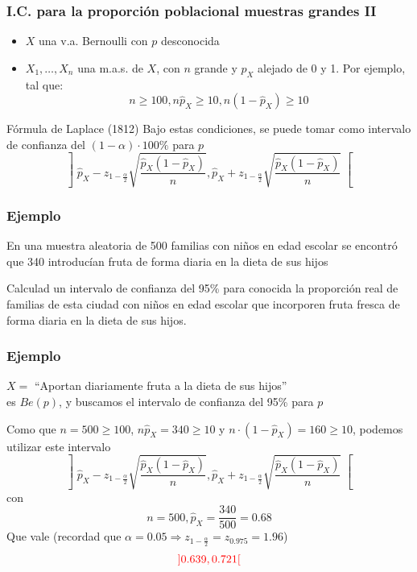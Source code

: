\documentclass[12pt,t]{beamer}\usepackage[]{graphicx}\usepackage[]{color}
\newcommand{\red}[1]{\textcolor{red}{#1}}
\renewcommand{\geq}{\geqslant}
\theoremstyle{plain}
\theoremstyle{definition}
\begin{document}
\begin{frame}[fragile]
\frametitle{I.C. para la proporción poblacional muestras grandes II}

\begin{itemize}
\item  $X$ una v.a. Bernoulli con $p$ desconocida
\item $X_1,\ldots,X_n$ una m.a.s. de $X$, con $n$  grande y $\widehat{p}_{X}$ alejado  de 0 y 1. Por ejemplo, tal que:
$$
n\geq 100, n\widehat{p}_{X}\geq 10,  n(1-\widehat{p}_{X})\geq 10
$$
\end{itemize}
\medskip

\begin{block}{Fórmula de Laplace (1812)}
Bajo  estas  condiciones, se puede tomar como intervalo de  confianza  del $(1-\alpha)\cdot 100\%$ para $p$
$$
\left]\widehat{p}_{X}-z_{1-\frac{\alpha}{2}}\sqrt{\frac{\widehat{p}_{X}
(1-\widehat{p}_{X})}{n}},
\widehat{p}_{X}+z_{1-\frac{\alpha}{2}}\sqrt{\frac{\widehat{p}_{X}
(1-\widehat{p}_{X})}{n}}\right[$$
\end{block}
\end{frame}



\begin{frame}
\frametitle{Ejemplo}

En una muestra aleatoria de 500 familias con niños en edad escolar se encontró que 
340 introducían fruta de forma diaria en la dieta de sus hijos
\medskip

Calculad un intervalo de confianza  del 95\% para  conocida la proporción real de
familias de esta ciudad con niños en edad escolar que incorporen fruta fresca de
forma diaria en la dieta de sus hijos.


\end{frame}
\begin{frame}
\frametitle{Ejemplo}

$X=$ ``Aportan diariamente fruta a la dieta de sus hijos''\\
 es $Be(p)$, y buscamos el  intervalo de confianza  del 95\%  para $p$ 
\bigskip

Como que $n=500\geq 100$, $n\widehat{p}_X=340\geq 10$ y $n\cdot (1-\widehat{p}_X)=160\geq 10$, podemos utilizar  este intervalo
$$
\left]\widehat{p}_{X}-z_{1-\frac{\alpha}{2}}\sqrt{\frac{\widehat{p}_{X}
(1-\widehat{p}_{X})}{n}},
\widehat{p}_{X}+z_{1-\frac{\alpha}{2}}\sqrt{\frac{\widehat{p}_{X}
(1-\widehat{p}_{X})}{n}}\right[
$$
con
$$
n=500, \widehat{p}_{X}=\dfrac{340}{500}=0.68
$$
Que vale (recordad que  {\small $\alpha=0.05\Rightarrow z_{1-\frac{\alpha}{2}}=z_{0.975}=1.96$})
$$
\red{]0.639,0.721[}
$$

\end{frame}
\end{document}
